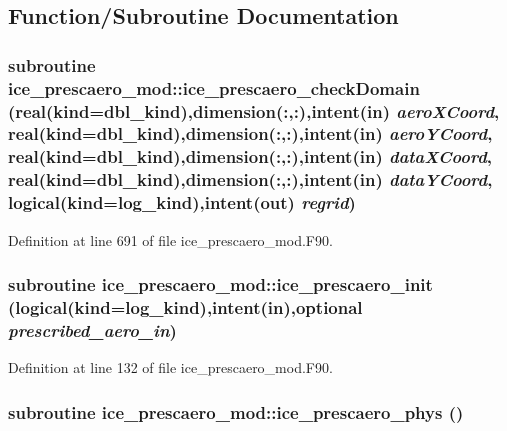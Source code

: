 \subsection{Function/Subroutine Documentation}
\hypertarget{namespaceice__prescaero__mod_a047baf1e9b916248581b645f065f84d7}{
\subsubsection[{ice\_\-prescaero\_\-checkDomain}]{\setlength{\rightskip}{0pt plus 5cm}subroutine ice\_\-prescaero\_\-mod::ice\_\-prescaero\_\-checkDomain (real(kind=dbl\_\-kind),dimension(:,:),intent(in) {\em aeroXCoord}, \/  real(kind=dbl\_\-kind),dimension(:,:),intent(in) {\em aeroYCoord}, \/  real(kind=dbl\_\-kind),dimension(:,:),intent(in) {\em dataXCoord}, \/  real(kind=dbl\_\-kind),dimension(:,:),intent(in) {\em dataYCoord}, \/  logical(kind=log\_\-kind),intent(out) {\em regrid})}}
\label{namespaceice__prescaero__mod_a047baf1e9b916248581b645f065f84d7}


Definition at line 691 of file ice\_\-prescaero\_\-mod.F90.\hypertarget{namespaceice__prescaero__mod_a49687e63d926d56d80c47d29f3348bf3}{
\subsubsection[{ice\_\-prescaero\_\-init}]{\setlength{\rightskip}{0pt plus 5cm}subroutine ice\_\-prescaero\_\-mod::ice\_\-prescaero\_\-init (logical(kind=log\_\-kind),intent(in),optional {\em prescribed\_\-aero\_\-in})}}
\label{namespaceice__prescaero__mod_a49687e63d926d56d80c47d29f3348bf3}


Definition at line 132 of file ice\_\-prescaero\_\-mod.F90.\hypertarget{namespaceice__prescaero__mod_a255b193e694ed5ffbbad1b5c3935173b}{
\subsubsection[{ice\_\-prescaero\_\-phys}]{\setlength{\rightskip}{0pt plus 5cm}subroutine ice\_\-prescaero\_\-mod::ice\_\-prescaero\_\-phys ()}}
\label{namespaceice__prescaero__mod_a255b193e694ed5ffbbad1b5c3935173b}


